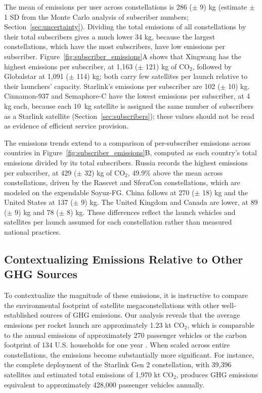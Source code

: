 \documentclass[pdflatex,sn-mathphys-num]{sn-jnl}
\theoremstyle{thmstyleone}%
\theoremstyle{thmstyletwo}%
\theoremstyle{thmstylethree}%
\begin{document}
The mean of emissions per user across constellations is 286 ($\pm$ 9) kg (estimate $\pm$ 1 SD from the Monte Carlo analysis of subscriber numbers; Section~\ref{sec:uncertainty}). Dividing the total emissions of all constellations by their total subscribers gives a much lower 34 kg, because the largest constellations, which have the most subscribers, have low emissions per subscriber. Figure~\ref{fig:subscriber_emissions}A shows that Xingwang has the highest emissions per subscriber, at 1,163 ($\pm$ 121) kg of CO$_2$, followed by Globalstar at 1,091 ($\pm$ 114) kg; both carry few satellites per launch relative to their launchers' capacity. Starlink's emissions per subscriber are 102 ($\pm$ 10) kg. Cinnamon-937 and Semaphore-C have the lowest emissions per subscriber, at 4 kg each, because each 10~kg satellite is assigned the same number of subscribers as a Starlink satellite (Section~\ref{sec:subscribers}); these values should not be read as evidence of efficient service provision.

The emissions trends extend to a comparison of per-subscriber emissions across countries in Figure~\ref{fig:subscriber_emissions}B, computed as each country's total emissions divided by its total subscribers. Russia records the highest emissions per subscriber, at 429 ($\pm$ 32) kg of CO$_2$, 49.9\% above the mean across constellations, driven by the Rassvet and SferaCon constellations, which are modeled on the expendable Soyuz-FG. China follows at 270 ($\pm$ 18) kg and the United States at 137 ($\pm$ 9) kg. The United Kingdom and Canada are lower, at 89 ($\pm$ 9) kg and 78 ($\pm$ 8) kg. These differences reflect the launch vehicles and satellites per launch assumed for each constellation rather than measured national practices.

\subsection{Contextualizing Emissions Relative to Other GHG Sources}
To contextualize the magnitude of these emissions, it is instructive to compare the environmental footprint of satellite megaconstellations with other well-established sources of GHG emissions. Our analysis reveals that the average emissions per rocket launch are approximately 1.23 kt CO$_2$, which is comparable to the annual emissions of approximately 270 passenger vehicles \citep{epa_greenhouse_2015} or the carbon footprint of 134 U.S. households for one year \citep{eia_frequently_nodate}. When scaled across entire constellations, the emissions become substantially more significant. For instance, the complete deployment of the Starlink Gen 2 constellation, with 39,396 satellites and estimated total emissions of 1,970 kt CO$_2$, produces GHG emissions equivalent to approximately 428,000 passenger vehicles annually.
\end{document}

